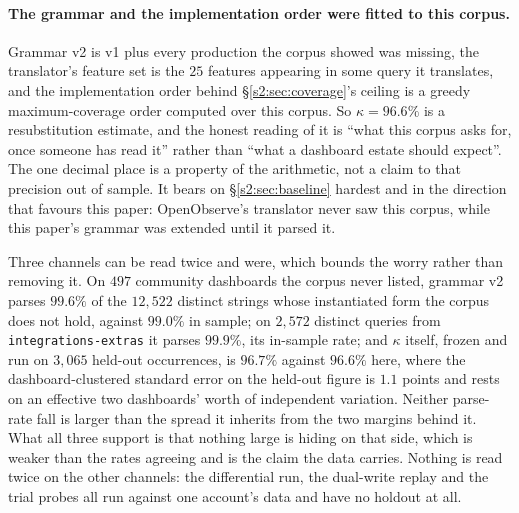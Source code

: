 \paragraph{The grammar and the implementation order were fitted to this corpus.}
Grammar v2 is v1 plus every production the corpus showed was missing, the translator's
feature set is the $25$ features appearing in some query it translates, and
the implementation order behind \S\ref{s2:sec:coverage}'s ceiling is a greedy
maximum-coverage order computed over this corpus. So $\kappa=96.6\%$ is a resubstitution estimate, and the honest reading of it is
``what this corpus asks for, once someone has read it'' rather than ``what a dashboard
estate should expect''. The one decimal place is a property of the arithmetic, not a claim
to that precision out of sample. It bears on \S\ref{s2:sec:baseline} hardest and in the
direction that favours this paper: OpenObserve's translator never saw this corpus, while
this paper's grammar was extended until it parsed it.

Three channels can be read twice and were, which bounds the worry rather than removing it.
On $497$ community dashboards the corpus never listed, grammar v2 parses $99.6\%$ of the
$12{,}522$ distinct strings whose instantiated form the corpus does not hold, against
$99.0\%$ in sample; on $2{,}572$ distinct queries from \texttt{integrations-extras} it
parses $99.9\%$, its in-sample rate; and $\kappa$ itself, frozen and run on $3{,}065$
held-out occurrences, is $96.7\%$ against $96.6\%$ here, where the dashboard-clustered
standard error on the held-out figure is $1.1$ points and rests on an effective two
dashboards' worth of independent variation. Neither parse-rate fall is larger than the
spread it inherits from the two margins behind it. What all three support is that nothing
large is hiding on that side, which is weaker than the rates agreeing and is the claim the
data carries. Nothing is read twice on the other channels: the differential run, the
dual-write replay and the trial probes all run against one account's data and have no
holdout at all.


